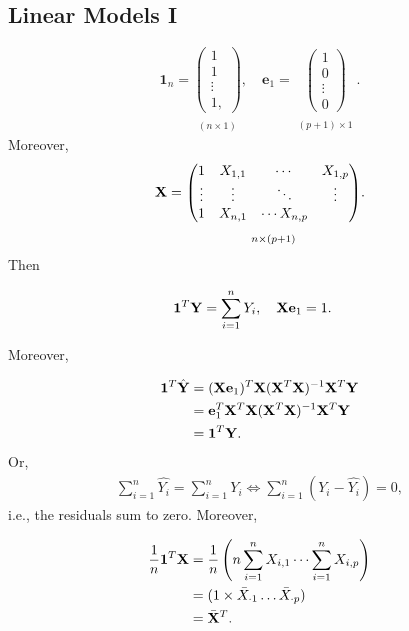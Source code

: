 \subsection{Linear Models I}
\[
		\mathbf 1_n=\underset{\substack{\\ (n\times 1)}}{\begin{pmatrix} 1 \\ 1 \\ \vdots \\ 1, \end{pmatrix}}, \quad \mathbf e_1= \underset{\substack{\\ (p+1)\times 1}}{\begin{pmatrix} 1 \\ 0 \\ \vdots \\ 0 \end{pmatrix}} 
.\]
Moreover,
\[\mathbf X=
		\underset{\substack{\\ \\ n\times(p+1)}}{\begin{pmatrix} 1 & X_{1,1} &\cdots & X_{1,p} \\ \vdots &\vdots &\ddots &\vdots \\ 1 & X_{n,1} &\cdots X_{n,p} \end{pmatrix}}
.\] 
Then

\begin{align*}
	&\mathbf 1^T\mathbf Y=\sum^n_{i=1}Y_i, \quad \mathbf X \mathbf e_1=1
.\end{align*}

Moreover,

\begin{align*}
	\mathbf 1^T \hat{\mathbf Y} 
	&= (\mathbf X\mathbf e_1)^T \mathbf X(\mathbf X^T\mathbf X)^{-1} \mathbf X^T\mathbf Y \\
	&= \mathbf e_1^T \mathbf X^T\mathbf X(\mathbf X^T\mathbf X)^{-1}\mathbf X^T\mathbf Y\\
	&= \mathbf 1^T \mathbf Y
.\end{align*}
Or, 
\begin{align*}
	\sum_{i=1}^{n} \hat{Y_i}=\sum_{i=1}^nY_i \iff \sum^n_{i=1} \left(Y_i-\hat{Y_i} \right) =0
,\end{align*}
i.e., the residuals sum to zero. Moreover,

\begin{align*}
	\frac{1}{n}\mathbf 1^T\mathbf X 
	&=\frac{1}{n}\left( n\sum^n_{i=1}X_{i,1} \cdots \sum^n_{i=1}X_{i,p}  \right) \\
	&= (1\times  \bar{X}_{\cdot 1}\ldots \bar{X}_{\cdot p}) \\
	&= \bar{\mathbf X}^T 
.\end{align*}

